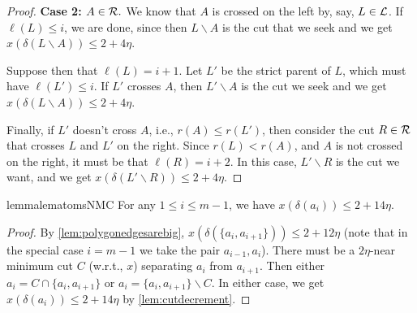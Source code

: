 \begin{proof}
{\bf Case 2: $A\in {\cal R}.$}
We know that $A$ is crossed on the left by, say,  $L\in {\cal L}$. 
If $\ell(L) \le i$, we are done, since then $L\smallsetminus A$ is the cut that we seek and we get $x(\delta(L\smallsetminus A))\leq 2+4\eta$.

Suppose then that $\ell(L) = i+1$. Let $L'$ be the strict parent of $L$, which must have $\ell(L') \le i$. 
If $L'$ crosses $A$, then $L' \smallsetminus A$ is the cut we seek and we get $x(\delta(L\smallsetminus A))\leq 2+4\eta$.

Finally, if $L'$ doesn't cross $A$, i.e., $r(A) \le r(L')$,
then consider the cut $R \in {\mathcal{R}}$ that crosses $L$ and $L'$ on the right. Since $r(L) < r(A)$, and $A$ is not crossed on the right, it must be that $\ell(R) = i+2$.
In this case, $L' \smallsetminus R$ is the cut we want, and we get
$x(\delta(L'\smallsetminus R))\leq 2+4\eta$.
\end{proof}

\begin{restatable}{lemma}{lematomsNMC}\label{lem:smallatoms}
For any $1\leq i\leq m-1$, we have $x(\delta(a_i))\leq 2+14\eta.$ 
\end{restatable}
\begin{proof}
By \cref{lem:polygonedgesarebig}, $x(\delta(\{a_i,a_{i+1}\}))\leq 2+12\eta$ (note that in the special case $i=m-1$ we take the pair $a_{i-1},a_i$). There must be a $2\eta$-near minimum cut $C$ (w.r.t., $x$) separating $a_{i}$ from $a_{i+1}$. Then either $a_i=C\cap \{a_i,a_{i+1}\}$ or $a_i=\{a_i,a_{i+1}\}\smallsetminus C$. In either case, we get $x(\delta(a_i))\leq 2+14\eta$ by \cref{lem:cutdecrement}.
\end{proof}



\def\cH{\mathcal{H}}

